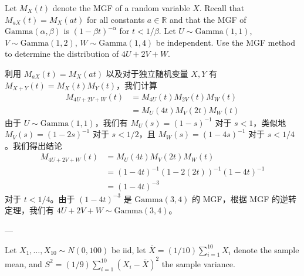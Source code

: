 \begin{questions}

\question
Let $M_X(t)$ denote the MGF of a random variable $X$. Recall that $M_{aX}(t) = M_X(at)$ for all constants $a \in \mathbb{R}$ and that the MGF of $\text{Gamma}(\alpha, \beta)$ is $(1 - \beta t)^{-\alpha}$ for $t < 1/\beta$.
Let $U \sim \text{Gamma}(1, 1)$, $V \sim \text{Gamma}(1, 2)$, $W \sim \text{Gamma}(1, 4)$ be independent. Use the MGF method to determine the distribution of $4U + 2V + W$.
\begin{solution}
    利用 $M_{aX}(t) = M_X(at)$ 以及对于独立随机变量 $X, Y$ 有 $M_{X+Y}(t) = M_X(t)M_Y(t)$，我们计算
    \begin{align*}
    M_{4U+2V+W}(t) &= M_{4U}(t)M_{2V}(t)M_W(t) \\
    &= M_U(4t)M_V(2t)M_W(t)
    \end{align*}
    由于 $U \sim \text{Gamma}(1, 1)$，我们有 $M_U(s) = (1 - s)^{-1}$ 对于 $s < 1$，类似地 $M_V(s) = (1 - 2s)^{-1}$ 对于 $s < 1/2$，且 $M_W(s) = (1 - 4s)^{-1}$ 对于 $s < 1/4$。我们得出结论
    \begin{align*}
    M_{4U+2V+W}(t) &= M_U(4t)M_V(2t)M_W(t) \\
    &= (1 - 4t)^{-1} (1 - 2(2t))^{-1} (1 - 4t)^{-1} \\
    &= (1 - 4t)^{-3}
    \end{align*}
    对于 $t < 1/4$。由于 $(1 - 4t)^{-3}$ 是 $\text{Gamma}(3, 4)$ 的 MGF，根据 MGF 的逆转定理，我们有 $4U + 2V + W \sim \text{Gamma}(3, 4)$。
\end{solution}

---

\question
Let $X_1, \dots, X_{10} \sim N(0, 100)$ be iid, let $\bar{X} = (1/10) \sum_{i=1}^{10} X_i$ denote the sample mean, and $S^2 = (1/9) \sum_{i=1}^{10} (X_i - \bar{X})^2$ the sample variance.
\begin{parts}

\end{parts}
\end{questions}
